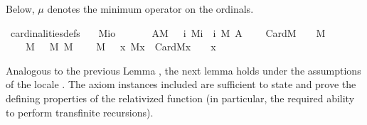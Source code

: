 %
Below, $\mu$ denotes the minimum operator on the ordinals.%
\begin{isabelle}
  \isamarkupfalse%
\ cardinalities{\isacharunderscore}{\kern0pt}defs{\isacharcolon}{\kern0pt}\isanewline
\ \ \ M{\isacharcolon}{\kern0pt}{\isacharcolon}{\kern0pt}{\isachardoublequoteopen}i{\isasymRightarrow}o{\isachardoublequoteclose}\isanewline
\ \ \isanewline
\ \ \ \ {\isachardoublequoteopen}{\isacharbar}{\kern0pt}A{\isacharbar}{\kern0pt}\isactrlbsup M\isactrlesup \ {\isasymequiv}\ {\isasymmu}\ i{\isachardot}{\kern0pt}\ M{\isacharparenleft}{\kern0pt}i{\isacharparenright}{\kern0pt}\ {\isasymand}\ i\ {\isasymapprox}\isactrlbsup M\isactrlesup \ A{\isachardoublequoteclose}\isanewline
\ \ \ \ {\isachardoublequoteopen}Card\isactrlbsup M\isactrlesup {\isacharparenleft}{\kern0pt}{\isasymalpha}{\isacharparenright}{\kern0pt}\ {\isasymequiv}\ {\isasymalpha}\ {\isacharequal}{\kern0pt}\ {\isacharbar}{\kern0pt}{\isasymalpha}{\isacharbar}{\kern0pt}\isactrlbsup M\isactrlesup {\isachardoublequoteclose}\isanewline
\ \ \ \ {\isachardoublequoteopen}{\isasymkappa}\isactrlbsup {\isasymup}{\isasymnu}{\isacharcomma}{\kern0pt}M\isactrlesup \ {\isasymequiv}\ {\isacharbar}{\kern0pt}{\isasymnu}\ {\isasymrightarrow}\isactrlbsup M\isactrlesup \ {\isasymkappa}{\isacharbar}{\kern0pt}\isactrlbsup M\isactrlesup {\isachardoublequoteclose}\isanewline
\ \ \ \ {\isachardoublequoteopen}{\isacharparenleft}{\kern0pt}{\isasymkappa}\isactrlsup {\isacharplus}{\kern0pt}{\isacharparenright}{\kern0pt}\isactrlbsup M\isactrlesup \ {\isasymequiv}\ {\isasymmu}\ x{\isachardot}{\kern0pt}\ M{\isacharparenleft}{\kern0pt}x{\isacharparenright}{\kern0pt}\ {\isasymand}\ Card\isactrlbsup M\isactrlesup {\isacharparenleft}{\kern0pt}x{\isacharparenright}{\kern0pt}\ {\isasymand}\ {\isasymkappa}\ {\isacharless}{\kern0pt}\ x{\isachardoublequoteclose}
\end{isabelle}
Analogous to the previous Lemma
,
the next lemma holds under
the assumptions of the locale . The axiom instances
included are sufficient to state and prove the defining
properties of the relativized  function
(in particular, the required ability to perform transfinite recursions).%
